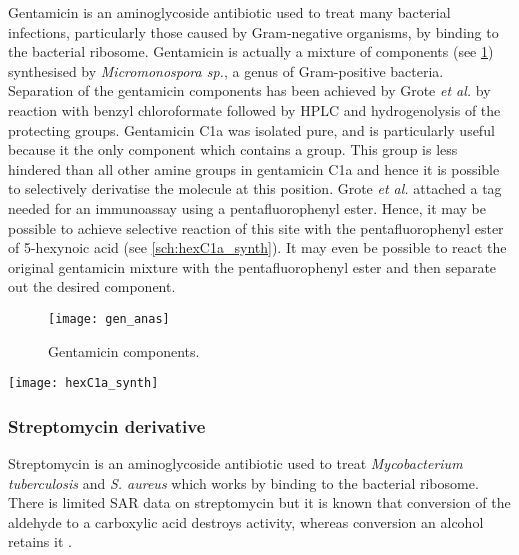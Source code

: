 Gentamicin is an aminoglycoside antibiotic used to treat many bacterial infections, particularly those caused by Gram-negative organisms, by binding to the bacterial ribosome. Gentamicin is actually a mixture of components (see \ref{fgr:gen_anas}) synthesised by \textit{Micromonospora sp.}, a genus of Gram-positive bacteria. Separation of the gentamicin components has been achieved by Grote \textit{et al.} \cite{Grote2012} by reaction with benzyl chloroformate followed by HPLC and hydrogenolysis of the protecting groups. 
Gentamicin C1a  was isolated pure, and is particularly useful because it the only component which contains a  group. This group is less hindered than all other amine groups in gentamicin C1a  and hence it is possible to selectively derivatise the molecule at this position. Grote \textit{et al.} attached a tag needed for an immunoassay using a pentafluorophenyl ester\cite{Cheshev2010}. Hence, it may be possible to achieve selective reaction of this site with the pentafluorophenyl ester of 5-hexynoic acid  (see \ref{sch:hexC1a_synth}). It may even be possible to react the original gentamicin mixture with the pentafluorophenyl ester  and then separate out the desired component.

\begin{figure}[H]
	\begin{center}
		\texttt{[image: gen\_anas]}
		\caption{Gentamicin components. \label{fgr:gen_anas}} 
	\end{center}
\end{figure}

\begin{scheme}[H]
	\begin{center}
		\texttt{[image: hexC1a\_synth]}
		\caption{Proposed synthesis of gentamicin C1a derivative . a) DIPEA, DMF, - 55 $^{\circ}$C. \label{sch:hexC1a_synth}}
	\end{center}
\end{scheme}

\subsubsection{Streptomycin derivative }

Streptomycin  is an aminoglycoside antibiotic used to treat \textit{Mycobacterium tuberculosis} and \textit{S. aureus} which works by binding to the bacterial ribosome. There is limited SAR data on streptomycin but it is known that conversion of the aldehyde to a carboxylic acid destroys activity, whereas conversion an alcohol retains it \cite{lemke2012foye}. 

